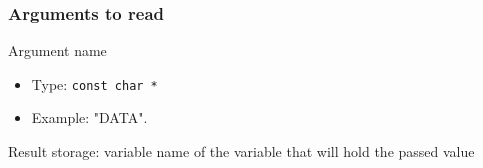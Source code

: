 \documentclass{beamer}
\begin{document}

\begin{frame}
\frametitle{Arguments to read}
Argument name
\begin{itemize}
	\item Type: \lstinline!const char *!
	\item Example: "DATA".
\end{itemize}
Result storage: variable name of the variable that will hold the passed value
\end{frame}

\end{document}
